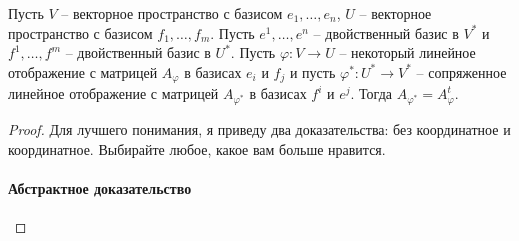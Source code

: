 \begin{claim}
\label{claim::DualHomMatrix}
Пусть $V$ -- векторное пространство с базисом $e_1,\ldots,e_n$, $U$ -- векторное пространство с базисом $f_1,\ldots,f_m$.
Пусть $e^1,\ldots,e^n$ -- двойственный базис в $V^*$ и $f^1,\ldots,f^m$ -- двойственный базис в $U^*$.
Пусть $\varphi \colon V\to U$ -- некоторый линейное отображение с матрицей $A_\varphi$ в базисах $e_i$ и $f_j$ и пусть $\varphi^*\colon U^*\to V^*$ -- сопряженное линейное отображение с матрицей $A_{\varphi^*}$ в базисах $f^i$ и $e^j$.
Тогда $A_{\varphi^*} = A_{\varphi}^t$.
\end{claim}
\begin{proof}
Для лучшего понимания, я приведу два доказательства: без координатное и координатное.
Выбирайте любое, какое вам больше нравится.

\paragraph{Абстрактное доказательство}


\end{proof}
